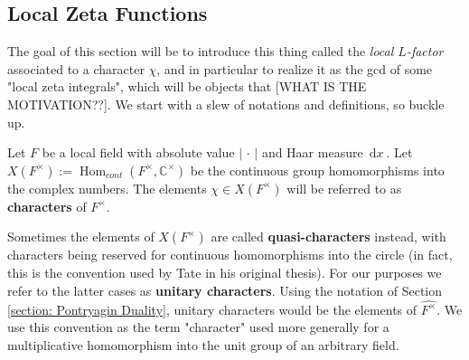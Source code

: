 \documentclass[11pt, x11names]{article}
\newcommand{\cc}{\mathbb{C}}
\newcommand{\abs}[1]{\left| \, #1  \,\right|}
\renewcommand{\hat}{\widehat}
\DeclareMathOperator{\Hom}{Hom}
\newcommand{\dx}{\, \mathrm{d}x \ }
\begin{document}
\subsection{Local Zeta Functions}
The goal of this section will be to introduce this thing called the \textit{local $L$-factor} associated to a character $\chi$, and in particular to realize it as the gcd of some "local zeta integrals", which will be objects that [WHAT IS THE MOTIVATION??]. We start with a slew of notations and definitions, so buckle up.

Let $F$ be a local field with absolute value $\abs{\cdot}$ and Haar measure $\dx$.
Let $X(F^\times) := \Hom_{cont}(F^\times, \cc^\times)$ be the continuous group homomorphisms into the complex numbers. The elements $\chi \in X(F^\times)$ will be referred to as \textbf{characters} of $F^\times$.
\begin{remark}
    Sometimes the elements of $X(F^\times)$ are called \textbf{quasi-characters} instead, with characters being reserved for continuous homomorphisms into the circle (in fact, this is the convention used by Tate in his original thesis). For our purposes we refer to the latter cases as \textbf{unitary characters}. Using the notation of Section \ref{section: Pontryagin Duality}, unitary characters would be the elements of $\hat{F^\times}$. We use this convention as the term "character" used more generally for a multiplicative homomorphism into the unit group of an arbitrary field.
\end{remark}
\end{document}
